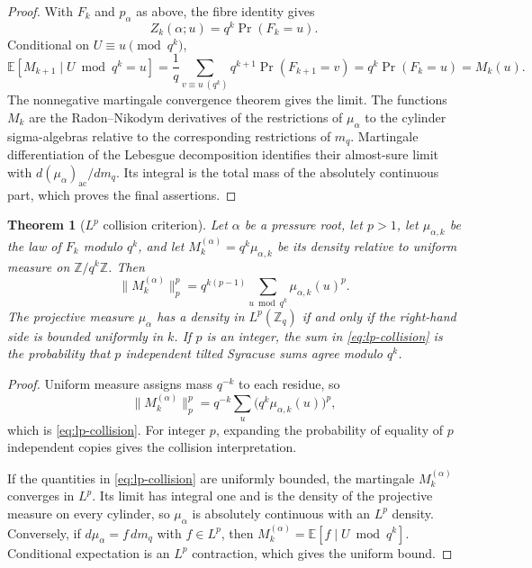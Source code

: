 \documentclass[11pt]{article}
\newtheorem{theorem}{Theorem}[section]
\theoremstyle{remark}
\begin{document}
\begin{proof}
With $F_k$ and $p_\alpha$ as above, the fibre identity gives
\[
 Z_k(\alpha;u)=q^k\Pr(F_k=u).
\]
Conditional on $U\equiv u\pmod {q^k}$,
\[
 \mathbb E[M_{k+1}\mid U\bmod q^k=u]
 =\frac1q\sum_{v\equiv u\ (q^k)}q^{k+1}\Pr(F_{k+1}=v)
 =q^k\Pr(F_k=u)=M_k(u).
\]
The nonnegative martingale convergence theorem gives the limit. The
functions $M_k$ are the Radon--Nikodym derivatives of the restrictions
of $\mu_\alpha$ to the cylinder sigma-algebras relative to the
corresponding restrictions of $m_q$. Martingale differentiation of the
Lebesgue decomposition identifies their almost-sure limit with
$d(\mu_\alpha)_{\mathrm{ac}}/dm_q$. Its integral is the total mass of
the absolutely continuous part, which proves the final assertions.
\end{proof}

\begin{theorem}[$L^p$ collision criterion]\label{thm:lp-collision}
Let $\alpha$ be a pressure root, let $p>1$, let $\mu_{\alpha,k}$ be the
law of $F_k$ modulo $q^k$, and
let $M_k^{(\alpha)}=q^k\mu_{\alpha,k}$ be its density relative to
uniform measure on $\mathbb Z/q^k\mathbb Z$. Then
\begin{equation}\label{eq:lp-collision}
 \lVert M_k^{(\alpha)}\rVert_p^p
 =q^{k(p-1)}\sum_{u\bmod q^k}\mu_{\alpha,k}(u)^p.
\end{equation}
The projective measure $\mu_\alpha$ has a density in $L^p(\mathbb Z_q)$
if and only if the right-hand side is bounded uniformly in $k$. If $p$
is an integer, the sum in \eqref{eq:lp-collision} is the probability
that $p$ independent tilted Syracuse sums agree modulo $q^k$.
\end{theorem}

\begin{proof}
Uniform measure assigns mass $q^{-k}$ to each residue, so
\[
 \lVert M_k^{(\alpha)}\rVert_p^p
 =q^{-k}\sum_u\bigl(q^k\mu_{\alpha,k}(u)\bigr)^p,
\]
which is \eqref{eq:lp-collision}. For integer $p$, expanding the
probability of equality of $p$ independent copies gives the collision
interpretation.

If the quantities in \eqref{eq:lp-collision} are uniformly bounded,
the martingale $M_k^{(\alpha)}$ converges in $L^p$. Its limit has integral
one and is the density of the projective measure on every cylinder, so
$\mu_\alpha$ is absolutely continuous with an $L^p$ density. Conversely,
if $d\mu_\alpha=f\,dm_q$ with $f\in L^p$, then
$M_k^{(\alpha)}=\mathbb E[f\mid U\bmod q^k]$. Conditional expectation is
an $L^p$ contraction, which gives the uniform bound.
\end{proof}
\end{document}
